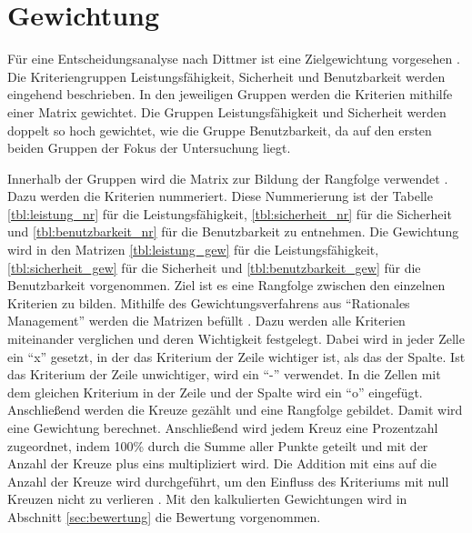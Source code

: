 \section{Gewichtung}
\label{sec:zielgewichtung}
Für eine Entscheidungsanalyse nach Dittmer ist eine Zielgewichtung vorgesehen \cite[vgl.][S. 142 ff.]{Dittmer.2002}. Die Kriteriengruppen Leistungsfähigkeit, Sicherheit und Benutzbarkeit werden eingehend beschrieben. In den jeweiligen Gruppen werden die Kriterien mithilfe einer Matrix gewichtet. Die Gruppen Leistungsfähigkeit und Sicherheit werden doppelt so hoch gewichtet, wie die Gruppe Benutzbarkeit, da auf den ersten beiden Gruppen der Fokus der Untersuchung liegt.

Innerhalb der Gruppen wird die Matrix zur Bildung der Rangfolge verwendet \cite[vgl.][146]{Dittmer.2002}. Dazu werden die Kriterien nummeriert. Diese Nummerierung ist der Tabelle \ref{tbl:leistung_nr} für die Leistungsfähigkeit,  \ref{tbl:sicherheit_nr} für die Sicherheit und \ref{tbl:benutzbarkeit_nr} für die Benutzbarkeit zu entnehmen.
Die Gewichtung wird in den Matrizen \ref{tbl:leistung_gew} für die Leistungsfähigkeit, \ref{tbl:sicherheit_gew} für die Sicherheit und \ref{tbl:benutzbarkeit_gew} für die Benutzbarkeit vorgenommen. Ziel ist es eine Rangfolge zwischen den einzelnen Kriterien zu bilden.  Mithilfe des Gewichtungsverfahrens aus "`Rationales Management"' werden die Matrizen befüllt \cite[vgl.][S. 146 f.]{Dittmer.2002}. Dazu werden  alle Kriterien miteinander verglichen und deren Wichtigkeit festgelegt. Dabei wird in jeder Zelle ein "`x"' gesetzt, in der das Kriterium der Zeile wichtiger ist, als das der Spalte. Ist das Kriterium der Zeile unwichtiger, wird ein "`-"' verwendet. In die Zellen mit dem gleichen Kriterium in der Zeile und der Spalte wird ein "`o"' eingefügt. Anschließend werden die Kreuze gezählt und eine Rangfolge gebildet. Damit wird eine Gewichtung berechnet. Anschließend wird jedem Kreuz eine Prozentzahl zugeordnet, indem 100\% durch die Summe aller Punkte geteilt und mit der Anzahl der Kreuze plus eins multipliziert wird. Die Addition mit eins auf die Anzahl der Kreuze wird durchgeführt, um den Einfluss des Kriteriums mit null Kreuzen nicht zu verlieren  \cite[vgl.][150]{Dittmer.2002}. 
Mit den kalkulierten Gewichtungen wird in Abschnitt \ref{sec:bewertung} die Bewertung vorgenommen.
